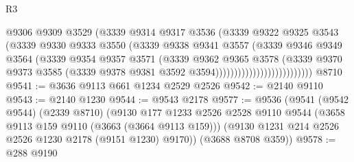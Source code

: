 \begin{lexlean}{R3}
\begin{coremodule}
                                      @9306
                                      @9309
                                      @3529
                                      (@3339
                                        @9314
                                        @9317
                                        @3536
                                        (@3339
                                          @9322
                                          @9325
                                          @3543
                                          (@3339
                                            @9330
                                            @9333
                                            @3550
                                            (@3339
                                              @9338
                                              @9341
                                              @3557
                                              (@3339
                                                @9346
                                                @9349
                                                @3564
                                                (@3339
                                                  @9354
                                                  @9357
                                                  @3571
                                                  (@3339
                                                    @9362
                                                    @9365
                                                    @3578
                                                    (@3339
                                                      @9370
                                                      @9373
                                                      @3585
                                                      (@3339
                                                        @9378
                                                        @9381
                                                        @3592
                                                        @3594))))))))))))))))))))))))))
    @8710
@9541 := @3636 @9113 @661 @1234 @2529 @2526
@9542 := @2140 @9110
@9543 := @2140 @1230
@9544 := @9543 @2178
@9577 := @9536
    (@9541
      (@9542 @9544)
      (@2339 @8710)
      (@9130
        @177
        @1233
        @2526
        @2528
        @9110
        @9544
        (@3658 @9113 @159 @9110 (@3663 (@3664 @9113 @159)))
        (@9130 @1231 @214 @2526 @2526 @1230 @2178 (@9151 @1230) @9170))
      (@3688 @8708 @359))
@9578 := @288 @9190

\end{coremodule}
\end{lexlean}

